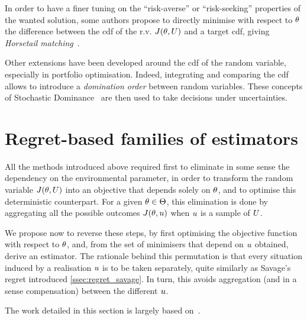 \documentclass[../../Main_ManuscritThese.tex]{subfiles}
\newcommand\imgpath{/home/victor/acadwriting/Manuscrit/Text/Chapter3/img/}
\begin{document}
In order to have a finer tuning on the ``risk-averse'' or
``risk-seeking'' properties of the wanted solution, some authors
propose to directly minimise with respect to $\theta$ the difference
between the cdf of the r.v. $J(\theta, U)$ and a target cdf, giving
\emph{Horsetail
  matching}~\citep{cook_extending_2017,cook_effective_2018}.

Other extensions have been developed around the cdf of the random
variable, especially in portfolio optimisation. Indeed, integrating
and comparing the cdf allows to introduce a \emph{domination order}
between random variables. These concepts of Stochastic
Dominance~\citep{ogryczak_stochastic_1997} are then used to take
decisions under uncertainties.


\section{Regret-based families of estimators}
\label{sec:rr_family}
All the methods introduced above required first to eliminate in some
sense the dependency on the environmental parameter, in order to
transform the random variable $J(\theta, U)$ into an objective that
depends solely on $\theta$, and to optimise this deterministic
counterpart.  For a given $\theta\in\Theta$, this elimination is done by
aggregating all the possible outcomes $J(\theta, u)$ when $u$ is a
sample of $U$.


We propose now to reverse these steps, by first optimising the
objective function with respect to $\theta$, and, from the set of
minimisers that depend on $u$ obtained, derive an estimator. The
rationale behind this permutation is that every situation induced by a
realisation $u$ is to be taken separately, quite similarly as
Savage's regret introduced \cref{ssec:regret_savage}.  In turn, this
avoids aggregation (and in a sense compensation) between the different
$u$.

The work detailed in this section is largely based
on~\cite{trappler_robust_2020}.

%   
\end{document}
